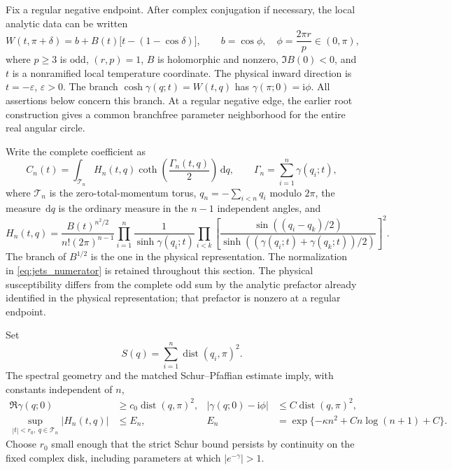 \documentclass[11pt]{article}
\numberwithin{equation}{section}
\theoremstyle{definition}
\newcommand{\dd}{\,\mathrm d}
\newcommand{\ii}{\mathrm i}
\newcommand{\eps}{\varepsilon}
\newcommand{\dist}{\operatorname{dist}}
\begin{document}
Fix a regular negative endpoint. After complex conjugation if necessary,
the local analytic data can be written
\begin{equation}\label{eq:jets_setting}
 W(t,\pi+\delta)=b+B(t)\bigl[t-(1-\cos\delta)\bigr],\qquad
 b=\cos\phi,\quad \phi=\frac{2\pi r}{p}\in(0,\pi),
\end{equation}
where $p\ge3$ is odd, $(r,p)=1$, $B$ is holomorphic and nonzero,
$\Im B(0)<0$, and $t$ is a nonramified local temperature coordinate.
The physical inward direction is $t=-\eps$, $\eps>0$. The branch
$\cosh\gamma(q;t)=W(t,q)$ has
$\gamma(\pi;0)=\ii\phi$. All assertions below concern this branch.
At a regular negative edge, the earlier root construction gives a common
branchfree parameter neighborhood for the entire real angular circle.

Write the complete coefficient as
\begin{equation}\label{eq:jets_full_coefficient}
 C_n(t)=\int_{\mathcal T_n}H_n(t,q)
        \coth\!\left(\frac{\Gamma_n(t,q)}2\right)\dd q,
 \qquad \Gamma_n=\sum_{i=1}^n\gamma(q_i;t),
\end{equation}
where $\mathcal T_n$ is the zero-total-momentum torus,
$q_n=-\sum_{i<n}q_i$ modulo $2\pi$, the measure $\dd q$ is the
ordinary measure in the $n-1$ independent angles, and
\begin{equation}\label{eq:jets_numerator}
 H_n(t,q)=\frac{B(t)^{n^2/2}}{n!(2\pi)^{n-1}}
 \prod_{i=1}^n\frac1{\sinh\gamma(q_i;t)}
 \prod_{i<k}\left[
  \frac{\sin((q_i-q_k)/2)}
       {\sinh((\gamma(q_i;t)+\gamma(q_k;t))/2)}
 \right]^2.
\end{equation}
The branch of $B^{1/2}$ is the one in the physical representation. The
normalization in \eqref{eq:jets_numerator} is retained throughout this
section. The physical susceptibility differs from the complete odd sum
by the analytic prefactor already identified in the physical
representation; that prefactor is nonzero at a regular endpoint.

Set
\[
 S(q)=\sum_{i=1}^n\dist(q_i,\pi)^2.
\]
The spectral geometry and the matched Schur--Pfaffian estimate imply,
with constants independent of $n$,
\begin{align}
 \Re\gamma(q;0)&\ge c_0\dist(q,\pi)^2,
 &|\gamma(q;0)-\ii\phi|&\le C\dist(q,\pi)^2,\label{eq:jets_attenuation0}\\
 \sup_{|t|<r_0,\ q\in\mathcal T_n}|H_n(t,q)|
 &\le E_n,
 &E_n&=\exp\{-\kappa n^2+C n\log(n+1)+C\}.
 \label{eq:jets_gaussian_num}
\end{align}
Choose $r_0$ small enough that the strict Schur bound persists by
continuity on the fixed complex disk, including parameters at
which $|e^{-\gamma}|>1$.
\end{document}
